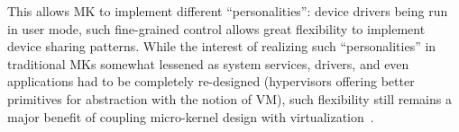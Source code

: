 \documentclass{sig-alternate}
\begin{document}
This allows MK to implement different ``personalities'': device drivers being run in user mode, such fine-grained control allows great flexibility to implement device sharing patterns.
%
%
%
While the interest of realizing such ``personalities'' in traditional MKs somewhat lessened as system services, drivers, and even applications had to be completely re-designed (hypervisors offering better primitives for abstraction with the notion of VM), 
%
%
%
such flexibility still remains a major benefit of coupling micro-kernel design with virtualization~\cite{OKL4}.


%
\end{document}
